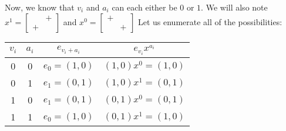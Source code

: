 \documentclass[letterpaper]{article}
\begin{document}
Now, we know that $ v_{i} $ and $ a_{i} $ can each either be $ 0 $ or $ 1 $.
We will also note $ x^1 = \begin{bmatrix} & + \\ + & \end{bmatrix} $ and $ x^0 = \begin{bmatrix} + & \\ & + \end{bmatrix} $
Let us enumerate all of the possibilities:
\begin{center}
\begin{tabular}{c | c | c | c }
\hline
$ v_i $ & $ a_i $ & $ e_{v_i + a_i} $ & $ e_{v_i} x^{a_i} $ \\
\hline
\hline
 0 & 0 & $ e_0 = (1, 0) $ & $ (1, 0) x^0 = (1, 0) $ \\
 0 & 1 & $ e_1 = (0, 1) $ & $ (1, 0) x^1 = (0, 1) $ \\
 1 & 0 & $ e_1 = (0, 1) $ & $ (0, 1) x^0 = (0, 1) $ \\
 1 & 1 & $ e_0 = (1, 0) $ & $ (0, 1) x^1 = (1, 0) $

\end{tabular}
\end{center}
\end{document}
